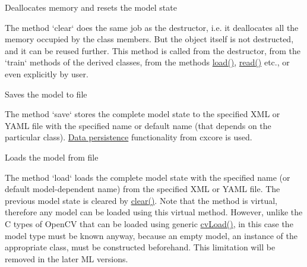 
Deallocates memory and resets the model state


The method `clear` does the same job as the destructor, i.e. it deallocates all the memory occupied by the class members. But the object itself is not destructed, and it can be reused further. This method is called from the destructor, from the `train` methods of the derived classes, from the methods \href{#CvStatModel.3A.3Aload}{load()}, \href{#CvStatModel.3A.3Aread}{read()} etc., or even explicitly by user.



Saves the model to file


The method `save` stores the complete model state to the specified XML or YAML file with the specified name or default name (that depends on the particular class). \href{opencvref_cxcore.htm#cxcore_persistence}{Data persistence} functionality from cxcore is used.



Loads the model from file


The method `load` loads the complete model state with the specified name (or default model-dependent name) from the specified XML or YAML file. The previous model state is cleared by \href{#CvStatModel.3A.3Aclear}{clear()}.
\newline
\newline
Note that the method is virtual, therefore any model can be loaded using this virtual method. However, unlike the C types of OpenCV that can be loaded using generic \href{opencvref_cxcore.htm#decl_cvLoad}{cvLoad()}, in this case the model type must be known anyway, because an empty model, an instance of the appropriate class, must be constructed beforehand. This limitation will be removed in the later ML versions.



